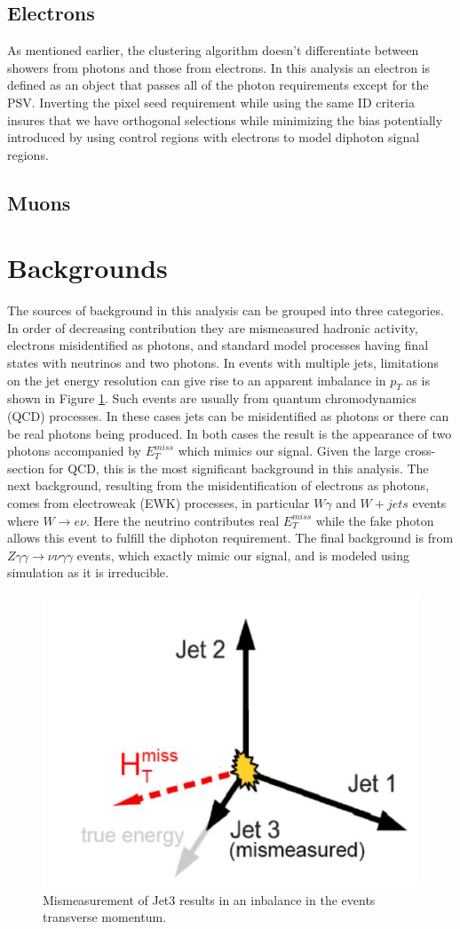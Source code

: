 \subsection{Electrons}
As mentioned earlier, the clustering algorithm doesn't differentiate between showers from photons and those from electrons.  In this analysis an electron is defined as an object that passes all of the photon requirements except for the PSV.  Inverting the pixel seed requirement while using the same ID criteria insures that we have orthogonal selections while minimizing the bias potentially introduced by using control regions with electrons to model diphoton signal regions. 


\subsection{Muons}

\section{Backgrounds}
The sources of background in this analysis can be grouped into three categories.  In order of decreasing contribution they are mismeasured hadronic activity, electrons misidentified as photons, and standard model processes having final states with neutrinos and two photons.  In events with multiple jets, limitations on the jet energy resolution can give rise to an apparent imbalance in $p_T$ as is shown in Figure \ref{fig:fakemet}.  Such events are usually from quantum chromodynamics (QCD) processes.  In these cases jets can be misidentified as photons or there can be real photons being produced.  In both cases the result is the appearance of two photons accompanied by $E^{miss}_T$ which mimics our signal.  Given the large cross-section for QCD, this is the most significant background in this analysis.  The next background, resulting from the misidentification of electrons as photons, comes from electroweak (EWK) processes, in particular $W\gamma$ and $W + jets$ events where $W \rightarrow e\nu$.  Here the neutrino contributes real $E^{miss}_T$ while the fake photon allows this event to fulfill the diphoton requirement.  The final background is from $Z\gamma \gamma \rightarrow \nu \nu \gamma \gamma$ events, which exactly mimic our signal, and is modeled using simulation as it is irreducible.

\begin{figure}
	\centering
	\includegraphics[width=0.5\linewidth]{Figures/FakeMET}
	\caption{Mismeasurement of Jet3 results in an inbalance in the events transverse momentum.}
	\label{fig:fakemet}
\end{figure}

